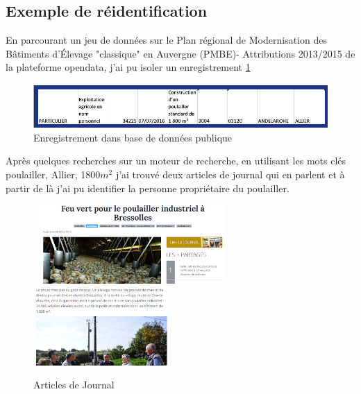\subsection{Exemple de réidentification}
En parcourant un jeu de données sur le Plan régional de Modernisation des Bâtiments d’Élevage "classique" en Auvergne (PMBE)- Attributions 2013/2015  de la plateforme opendata, j'ai pu isoler un enregistrement \ref{fig:Enregistrement d'une base de données publique}
\begin{figure}
    \centering
    \includegraphics[width=\textwidth]{images/anonymisation/exemple1_anonymisation.png}
    \caption{Enregistrement dans base de données publique}
    \label{fig:Enregistrement d'une base de données publique}
\end{figure}
Après quelques recherches sur un moteur de recherche, en utilisant les mots clés poulailler, Allier, 1800\begin{math}m^{2}\end{math} j'ai trouvé deux articles de journal qui en parlent et à partir de là j'ai pu identifier la personne propriétaire du poulailler.
\begin {figure}
\begin{center}
    \hbox{ 
    \includegraphics[height=3cm]{images/anonymisation/exemple2_anonymisation.png}
    \hspace*{1cm}  %
    \includegraphics[height=3cm]{images/anonymisation/exemple3_anonymisation.png}
  }
\caption{Articles de Journal}
\label{fig : Articles de Journal}
\end{center}
\end {figure}

